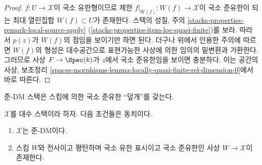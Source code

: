 \begin{proof}
$f : U \to \mathcal{X}$이 국소 유한형이므로 제한
$f|_{W(f)} : W(f) \to \mathcal{X}$이 국소 준유한이 되는 최대 열린집합
$W(f) \subset U$가 존재한다. 스택의 성질, 주의
\ref{stacks-properties-remark-local-source-apply}
(\ref{stacks-properties-item-loc-quasi-finite})를 보라.
따라서 $p(z)$가 $W(f)$의 점임을 보이기만 하면 된다.
더구나 위에서 인용한 주의에 따르면 $W(f)$의 형성은 대수공간으로
표현가능한 사상에 의한 임의의 밑변환과 가환한다. 그러므로 사상
$F \to \Spec(k)$가 $z$에서 국소 준유한임을 보이면 충분하다.
이는 공간의 사상, 보조정리
\ref{spaces-morphisms-lemma-locally-quasi-finite-rel-dimension-0}에서 바로
따른다.
\end{proof}

\noindent
준-DM 스택은 스킴에 의한 국소 준유한 ``덮개''를 갖는다.

\begin{theorem}
\label{theorem-quasi-DM}
$\mathcal{X}$를 대수 스택이라 하자. 다음 조건들은 동치이다.
\begin{enumerate}
\item $\mathcal{X}$는 준-DM이다.
\item 스킴 $W$와 전사이고 평탄하며 국소 유한 표시이고 국소 준유한인
사상 $W \to \mathcal{X}$이 존재한다.
\end{enumerate}
\end{theorem}

